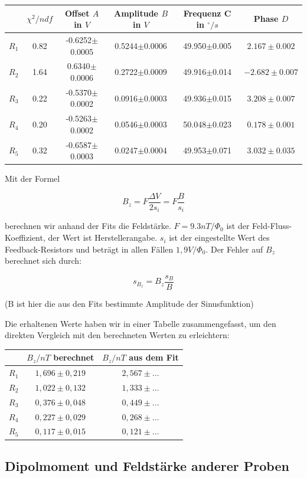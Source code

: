 \begin{tabular}[H]{| c | c | c | c | c | c |} \hline
 & $\chi^2 / ndf$ & Offset $A$ in $V$ & Amplitude $B$ in $V$ & Frequenz C in $^\circ/s$ & Phase $D$ \\ 
\hline
$R_1$ & 0.82 & -0.6252$\pm$0.0005 & 0.5244$\pm$0.0006 & 49.950$\pm$0.005 & $2.167 \pm 0.002$\\
$R_2$ & 1.64 & 0.6340$\pm$0.0006 & 0.2722$\pm$0.0009 & 49.916$\pm$0.014 & $-2.682 \pm 0.007$\\
$R_3$ & 0.22 & -0.5370$\pm$0.0002 & 0.0916$\pm$0.0003 & 49.936$\pm$0.015 & $3.208 \pm 0.007$\\
$R_4$ & 0.20 & -0.5263$\pm$0.0002 & 0.0546$\pm$0.0003 & 50.048$\pm$0.023 & $0.178 \pm 0.001$\\
$R_5$ & 0.32 & -0.6587$\pm$0.0003 & 0.0247$\pm$0.0004 & 49.953$\pm$0.071 & $3.032 \pm 0.035$\\ \hline
\end{tabular}

Mit der Formel 

$$ B_z = F \frac{\Delta V}{2s_i} = F\frac{B}{s_i} $$

berechnen wir anhand der Fits die Feldstärke. $F = 9.3 nT / \Phi_0$ ist der Feld-Fluss-Koeffizient, der Wert ist Herstellerangabe. $s_i$ ist der eingestellte Wert des Feedback-Resistors und beträgt in allen Fällen $1,9 V/ \Phi_0$. Der Fehler auf $B_z$ berechnet sich durch:

$$ s_{B_z} = B_z\frac{s_B}{B} $$

(B ist hier die aus den Fits bestimmte Amplitude der Sinusfunktion)
 
Die erhaltenen Werte haben wir in einer Tabelle zusammengefasst, um den direkten Vergleich mit den berechneten Werten zu erleichtern:

\begin{center}
\begin{tabular}[H]{| c | c | c |} \hline
 & $B_z / nT$ berechnet & $B_z / nT$ aus dem Fit\\ \hline \hline
 $R_1$ & $1,696 \pm 0,219$ & $2,567\pm ...$\\
 $R_2$ & $1,022 \pm 0,132$ & $1,333\pm ...$\\
 $R_3$ & $0,376 \pm 0,048$ & $0,449\pm ...$\\
 $R_4$ & $0,227 \pm 0,029$ & $0,268\pm ...$\\
 $R_5$ & $0,117 \pm 0,015$ & $0,121\pm ...$\\ \hline
 \end{tabular}
 \end{center}
 
 
 \subsection{Dipolmoment und Feldstärke anderer Proben}



















